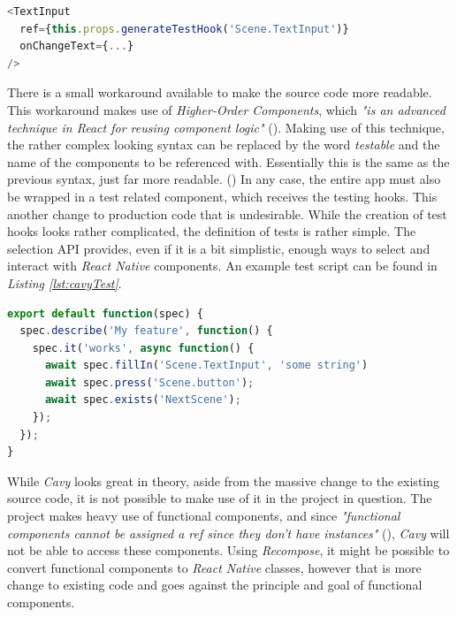 \begin{lstlisting}[language=javascript,caption=\textit{Cavy} Hook Example,label=lst:cavyHook]
<TextInput
  ref={this.props.generateTestHook('Scene.TextInput')}
  onChangeText={...}
/>
\end{lstlisting}

There is a small workaround available to make the source code more readable. This workaround makes use of \textit{Higher-Order Components}, which \textit{"is an advanced technique in React for reusing component logic"} (\cite{hoc}). Making use of this technique, the rather complex looking syntax can be replaced by the word \textit{testable} and the name of the components to be referenced with. Essentially this is the same as the previous syntax, just far more readable. (\cite{e2e_cavy})
\newline
In any case, the entire app must also be wrapped in a test related component, which receives the testing hooks. This another change to production code that is undesirable.
\newline
While the creation of test hooks looks rather complicated, the definition of tests is rather simple. The selection API provides, even if it is a bit simplistic, enough ways to select and interact with \textit{React Native} components. An example test script can be found in \textit{Listing \ref{lst:cavyTest}}.

\begin{lstlisting}[language=javascript,caption=\textit{Cavy} Test Example,label=lst:cavyTest]
export default function(spec) {
  spec.describe('My feature', function() {
    spec.it('works', async function() {
      await spec.fillIn('Scene.TextInput', 'some string')
      await spec.press('Scene.button');
      await spec.exists('NextScene');
    });
  });
}
\end{lstlisting}

While \textit{Cavy} looks great in theory, aside from the massive change to the existing source code, it is not possible to make use of it in the project in question. The project makes heavy use of functional components, and since \textit{"functional components cannot be assigned a ref since they don't have instances"} (\cite{cavy}), \textit{Cavy} will not be able to access these components. Using \textit{Recompose}, it might be possible to convert functional components to \textit{React Native} classes, however that is more change to existing code and goes against the principle and goal of functional components.